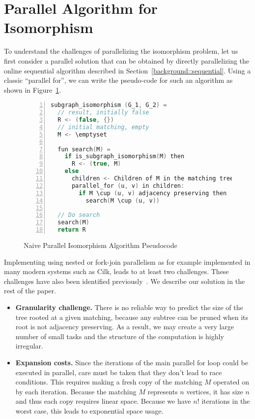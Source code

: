 
%
\section{Parallel Algorithm for Isomorphism}\label{sec:par-alg}

To understand the challenges of parallelizing the isomorphism problem,
let us first consider a parallel solution that can be obtained by
directly parallelizing the online sequential algorithm described in
Section~\ref{background::sequential}.
%
Using a classic ``parallel for'', we can write the pseudo-code for
such an algorithm as shown in  Figure~\ref{par-alg}.
%


%
\begin{figure}
  \centering

  \hspace*{3mm}
\begin{lstlisting}[language=c, numbers=left]
subgraph_isomorphism (G_1, G_2) =
  // result, initially false 
  R <- (false, {})
  // initial matching, empty  
  M <- \emptyset

  fun search(M) =
    if is_subgraph_isomorphism(M) then
      R <- (true, M)
    else
      children <- Children of M in the matching tree
      parallel_for (u, v) in children:
        if M \cup (u, v) adjacency preserving then
          search(M \cup (u, v))

  // Do search 
  search(M)
  return R
\end{lstlisting}
\caption{Naive Parallel Isomorphism Algorithm Pseudocode}
\label{par-alg}
\end{figure}

Implementing  using nested or fork-join parallelism
as for example implemented in many modern systems such as Cilk, leads
to at least two challenges.
%
These challenges have also been identified
previously~\cite{blankstein}.  We describe  our solution in the rest
of the paper.
%
\begin{itemize}
  \item \textbf{Granularity challenge.} There is no reliable way to
  predict the size of the tree rooted at a given matching, because
  any subtree can be pruned when its root is not adjacency preserving.
  As a result, we may create a very large number of small tasks and the
  structure of the computation is highly irregular.

\item \textbf{Expansion costs.} Since the iterations of the main
  parallel for loop could be executed in parallel, care must be taken
  that they don't lead to race conditions.  This requires making a
  fresh copy of the matching $M$ operated on by each
  iteration. Because the matching $M$ represents $n$ vertices, it has
  size $n$ and thus each copy requires linear space.
  Because we have $n!$ iterations in the worst case, this leads to
  exponential space usage.
\end{itemize}

